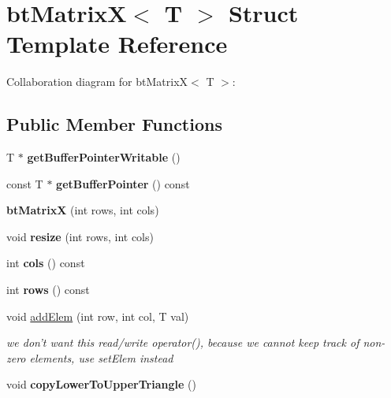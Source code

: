 \hypertarget{structbt_matrix_x}{\section{bt\+Matrix\+X$<$ T $>$ Struct Template Reference}
\label{structbt_matrix_x}
}


Collaboration diagram for bt\+Matrix\+X$<$ T $>$\+:
\subsection*{Public Member Functions}
\begin{DoxyCompactItemize}
\item 
\hypertarget{structbt_matrix_x_a828ae1f28a7714f41ba8b9ed77d1b82e}{T $\ast$ {\bfseries get\+Buffer\+Pointer\+Writable} ()}\label{structbt_matrix_x_a828ae1f28a7714f41ba8b9ed77d1b82e}

\item 
\hypertarget{structbt_matrix_x_aceb9988b8892083a6f3dd8dd973d9b5f}{const T $\ast$ {\bfseries get\+Buffer\+Pointer} () const }\label{structbt_matrix_x_aceb9988b8892083a6f3dd8dd973d9b5f}

\item 
\hypertarget{structbt_matrix_x_a5d3e06cd318ece61cd8d9d487d1b0981}{{\bfseries bt\+Matrix\+X} (int rows, int cols)}\label{structbt_matrix_x_a5d3e06cd318ece61cd8d9d487d1b0981}

\item 
\hypertarget{structbt_matrix_x_ad39611ae18fe6a6a60f5c79e805783e8}{void {\bfseries resize} (int rows, int cols)}\label{structbt_matrix_x_ad39611ae18fe6a6a60f5c79e805783e8}

\item 
\hypertarget{structbt_matrix_x_af3558f9386bd9dfb4770ad1fb696cefa}{int {\bfseries cols} () const }\label{structbt_matrix_x_af3558f9386bd9dfb4770ad1fb696cefa}

\item 
\hypertarget{structbt_matrix_x_aa6abd822c62bf304029486ec3472d958}{int {\bfseries rows} () const }\label{structbt_matrix_x_aa6abd822c62bf304029486ec3472d958}

\item 
\hypertarget{structbt_matrix_x_a9aa5ce8e2740582ed5c5652d7581b2e7}{void \hyperlink{structbt_matrix_x_a9aa5ce8e2740582ed5c5652d7581b2e7}{add\+Elem} (int row, int col, T val)}\label{structbt_matrix_x_a9aa5ce8e2740582ed5c5652d7581b2e7}

\begin{DoxyCompactList}\small\item\em we don't want this read/write operator(), because we cannot keep track of non-\/zero elements, use set\+Elem instead \end{DoxyCompactList}\item 
\hypertarget{structbt_matrix_x_aba97721ed1938421c146bdb61c917b90}{void {\bfseries copy\+Lower\+To\+Upper\+Triangle} ()}\label{structbt_matrix_x_aba97721ed1938421c146bdb61c917b90}


\end{DoxyCompactItemize}

